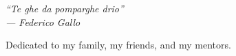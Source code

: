 \cleardoublepage
{}
\thispagestyle{empty}

\vspace*{3cm}

\begin{center}
    \slshape
    ``Te ghe da pomparghe drio'' \\ \medskip
    --- Federico Gallo
\end{center}

\medskip

\begin{center}
    Dedicated to my family, my friends, and my mentors.
\end{center}